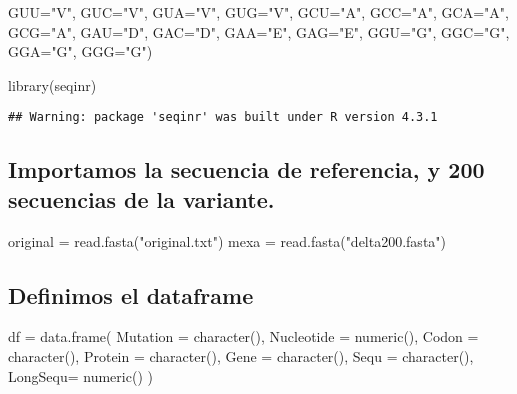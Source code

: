 \documentclass[
]{article}
\newenvironment{Shaded}{\begin{snugshade}}{\end{snugshade}}
\newcommand{\AttributeTok}[1]{\textcolor[rgb]{0.77,0.63,0.00}{#1}}
\newcommand{\FunctionTok}[1]{\textcolor[rgb]{0.00,0.00,0.00}{#1}}
\newcommand{\NormalTok}[1]{#1}
\newcommand{\OtherTok}[1]{\textcolor[rgb]{0.56,0.35,0.01}{#1}}
\newcommand{\StringTok}[1]{\textcolor[rgb]{0.31,0.60,0.02}{#1}}
\begin{document}
\begin{Shaded}
\begin{Highlighting}[]
            \AttributeTok{GUU=}\StringTok{"V"}\NormalTok{, }\AttributeTok{GUC=}\StringTok{"V"}\NormalTok{, }\AttributeTok{GUA=}\StringTok{"V"}\NormalTok{, }\AttributeTok{GUG=}\StringTok{"V"}\NormalTok{,}
            \AttributeTok{GCU=}\StringTok{"A"}\NormalTok{, }\AttributeTok{GCC=}\StringTok{"A"}\NormalTok{, }\AttributeTok{GCA=}\StringTok{"A"}\NormalTok{, }\AttributeTok{GCG=}\StringTok{"A"}\NormalTok{,}
            \AttributeTok{GAU=}\StringTok{"D"}\NormalTok{, }\AttributeTok{GAC=}\StringTok{"D"}\NormalTok{, }\AttributeTok{GAA=}\StringTok{"E"}\NormalTok{, }\AttributeTok{GAG=}\StringTok{"E"}\NormalTok{,}
            \AttributeTok{GGU=}\StringTok{"G"}\NormalTok{, }\AttributeTok{GGC=}\StringTok{"G"}\NormalTok{, }\AttributeTok{GGA=}\StringTok{"G"}\NormalTok{, }\AttributeTok{GGG=}\StringTok{"G"}\NormalTok{)}

\FunctionTok{library}\NormalTok{(seqinr)}
\end{Highlighting}
\end{Shaded}

\begin{verbatim}
## Warning: package 'seqinr' was built under R version 4.3.1
\end{verbatim}

\hypertarget{importamos-la-secuencia-de-referencia-y-200-secuencias-de-la-variante.}{%
\subsection{Importamos la secuencia de referencia, y 200 secuencias de
la
variante.}\label{importamos-la-secuencia-de-referencia-y-200-secuencias-de-la-variante.}}

\begin{Shaded}
\begin{Highlighting}[]
\NormalTok{original }\OtherTok{=} \FunctionTok{read.fasta}\NormalTok{(}\StringTok{"original.txt"}\NormalTok{)}
\NormalTok{mexa }\OtherTok{=} \FunctionTok{read.fasta}\NormalTok{(}\StringTok{"delta200.fasta"}\NormalTok{)}
\end{Highlighting}
\end{Shaded}

\hypertarget{definimos-el-dataframe}{%
\subsection{Definimos el dataframe}\label{definimos-el-dataframe}}

\begin{Shaded}
\begin{Highlighting}[]
\NormalTok{df }\OtherTok{=} \FunctionTok{data.frame}\NormalTok{(}
  \AttributeTok{Mutation =} \FunctionTok{character}\NormalTok{(),}
  \AttributeTok{Nucleotide =} \FunctionTok{numeric}\NormalTok{(),}
  \AttributeTok{Codon =} \FunctionTok{character}\NormalTok{(),}
  \AttributeTok{Protein =} \FunctionTok{character}\NormalTok{(),}
  \AttributeTok{Gene =} \FunctionTok{character}\NormalTok{(),}
  \AttributeTok{Sequ =} \FunctionTok{character}\NormalTok{(),}
  \AttributeTok{LongSequ=} \FunctionTok{numeric}\NormalTok{()}
\NormalTok{)}
\end{Highlighting}
\end{Shaded}
\end{document}
